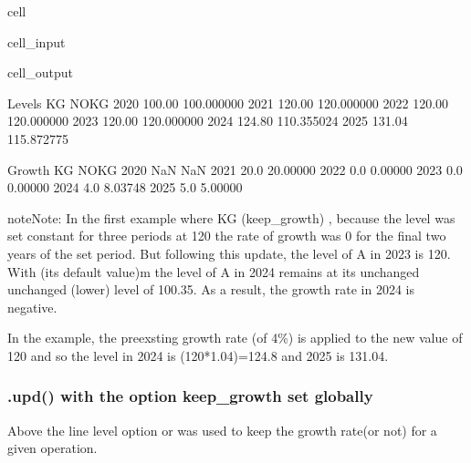 \documentclass[letterpaper,10pt,english]{jupyterBook}
\begin{document}
\begin{sphinxuseclass}{cell}
\begin{sphinxVerbatimInput}
\begin{sphinxuseclass}{cell_input}
\end{sphinxuseclass}\end{sphinxVerbatimInput}
\begin{sphinxVerbatimOutput}

\begin{sphinxuseclass}{cell_output}
\begin{sphinxVerbatim}[commandchars=\\\{\}]
Levels
          KG        NOKG
2020  100.00  100.000000
2021  120.00  120.000000
2022  120.00  120.000000
2023  120.00  120.000000
2024  124.80  110.355024
2025  131.04  115.872775

Growth
        KG      NOKG
2020   NaN       NaN
2021  20.0  20.00000
2022   0.0   0.00000
2023   0.0   0.00000
2024   4.0  \PYGZhy{}8.03748
2025   5.0   5.00000
\end{sphinxVerbatim}

\end{sphinxuseclass}\end{sphinxVerbatimOutput}

\end{sphinxuseclass}
\begin{sphinxadmonition}{note}{Note:}
\sphinxAtStartPar
In the first example where KG (keep\_growth) , because the level was set constant for three periods at 120 the rate of growth was 0 for the final two years of the set period.  But following this update, the level of A in 2023 is 120. With  (its default value)m the level of A in 2024 remains at its unchanged  unchanged (lower) level of 100.35. As a result, the growth rate in 2024 is negative.

\sphinxAtStartPar
In the  example, the pre\sphinxhyphen{}exsting growth rate (of 4\%) is applied to the new value of 120 and so the level in 2024 is (120*1.04)=124.8 and 2025 is 131.04.
\end{sphinxadmonition}


\subsubsection{.upd() with the option keep\_growth set globally}
\label{\detokenize{content/04_PythonEssentials/UpdateCommand:upd-with-the-option-keep-growth-set-globally}}
\sphinxAtStartPar
Above the line level option  or  was used to keep the growth rate(or not) for a given operation.
\end{document}
